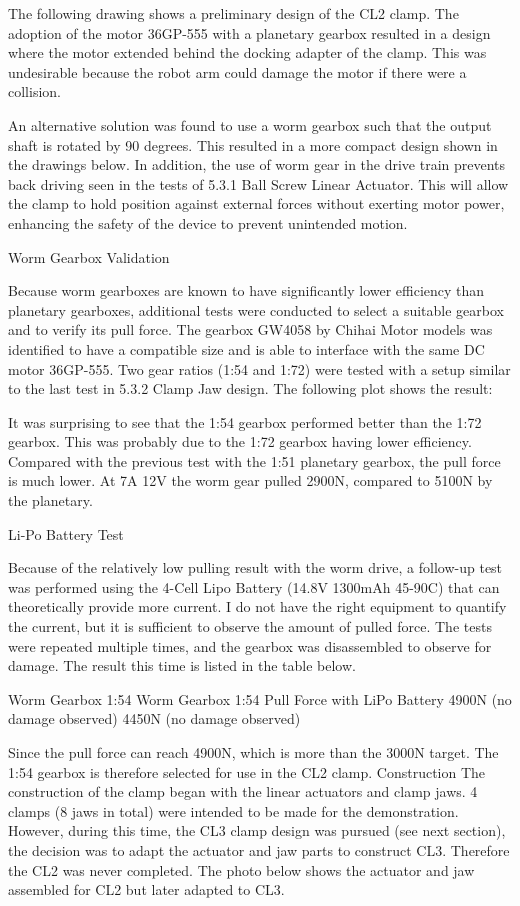 \begin{itemize}
The following drawing shows a preliminary design of the CL2 clamp. The adoption of the motor 36GP-555 with a planetary gearbox resulted in a design where the motor extended behind the docking adapter of the clamp. This was undesirable because the robot arm could damage the motor if there were a collision. 

An alternative solution was found to use a worm gearbox such that the output shaft is rotated by 90 degrees. This resulted in a more compact design shown in the drawings below. In addition, the use of worm gear in the drive train prevents back driving seen in the tests of 5.3.1 Ball Screw Linear Actuator. This will allow the clamp to hold position against external forces without exerting motor power, enhancing the safety of the device to prevent unintended motion.

Worm Gearbox Validation

Because worm gearboxes are known to have significantly lower efficiency than planetary gearboxes, additional tests were conducted to select a suitable gearbox and to verify its pull force. The gearbox GW4058 by Chihai Motor models was identified to have a compatible size and is able to interface with the same DC motor 36GP-555. Two gear ratios (1:54 and 1:72) were tested with a setup similar to the last test in 5.3.2 Clamp Jaw design. The following plot shows the result:

It was surprising to see that the 1:54 gearbox performed better than the 1:72 gearbox. This was probably due to the 1:72 gearbox having lower efficiency. Compared with the previous test with the 1:51 planetary gearbox, the pull force is much lower. At 7A 12V the worm gear pulled 2900N, compared to 5100N by the planetary.

Li-Po Battery Test

Because of the relatively low pulling result with the worm drive, a follow-up test was performed using the 4-Cell Lipo Battery (14.8V 1300mAh 45-90C) that can theoretically provide more current. I do not have the right equipment to quantify the current, but it is sufficient to observe the amount of pulled force. The tests were repeated multiple times, and the gearbox was disassembled to observe for damage. The result this time is listed in the table below. 


Worm Gearbox 1:54 
Worm Gearbox 1:54 
Pull Force with LiPo Battery
4900N (no damage observed)
4450N (no damage observed)

Since the pull force can reach 4900N, which is more than the 3000N target. The 1:54 gearbox is therefore selected for use in the CL2 clamp.
Construction 
The construction of the clamp began with the linear actuators and clamp jaws. 4 clamps (8 jaws in total) were intended to be made for the demonstration. However, during this time, the CL3 clamp design was pursued (see next section), the decision was to adapt the actuator and jaw parts to construct CL3. Therefore the CL2 was never completed. The photo below shows the actuator and jaw assembled for CL2 but later adapted to CL3.



\end{itemize}
